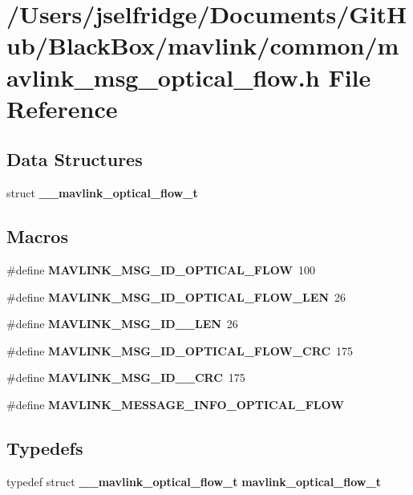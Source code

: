 \section{/\+Users/jselfridge/\+Documents/\+Git\+Hub/\+Black\+Box/mavlink/common/mavlink\+\_\+msg\+\_\+optical\+\_\+flow.h File Reference}
\label{mavlink__msg__optical__flow_8h}
\subsection*{Data Structures}
\begin{DoxyCompactItemize}
\item 
struct \textbf{ \+\_\+\+\_\+mavlink\+\_\+optical\+\_\+flow\+\_\+t}
\end{DoxyCompactItemize}
\subsection*{Macros}
\begin{DoxyCompactItemize}
\item 
\#define \textbf{ M\+A\+V\+L\+I\+N\+K\+\_\+\+M\+S\+G\+\_\+\+I\+D\+\_\+\+O\+P\+T\+I\+C\+A\+L\+\_\+\+F\+L\+OW}~100
\item 
\#define \textbf{ M\+A\+V\+L\+I\+N\+K\+\_\+\+M\+S\+G\+\_\+\+I\+D\+\_\+\+O\+P\+T\+I\+C\+A\+L\+\_\+\+F\+L\+O\+W\+\_\+\+L\+EN}~26
\item 
\#define \textbf{ M\+A\+V\+L\+I\+N\+K\+\_\+\+M\+S\+G\+\_\+\+I\+D\+\_\+\_\+\+L\+EN}~26
\item 
\#define \textbf{ M\+A\+V\+L\+I\+N\+K\+\_\+\+M\+S\+G\+\_\+\+I\+D\+\_\+\+O\+P\+T\+I\+C\+A\+L\+\_\+\+F\+L\+O\+W\+\_\+\+C\+RC}~175
\item 
\#define \textbf{ M\+A\+V\+L\+I\+N\+K\+\_\+\+M\+S\+G\+\_\+\+I\+D\+\_\+\_\+\+C\+RC}~175
\item 
\#define \textbf{ M\+A\+V\+L\+I\+N\+K\+\_\+\+M\+E\+S\+S\+A\+G\+E\+\_\+\+I\+N\+F\+O\+\_\+\+O\+P\+T\+I\+C\+A\+L\+\_\+\+F\+L\+OW}
\end{DoxyCompactItemize}
\subsection*{Typedefs}
\begin{DoxyCompactItemize}
\item 
typedef struct \textbf{ \+\_\+\+\_\+mavlink\+\_\+optical\+\_\+flow\+\_\+t} \textbf{ mavlink\+\_\+optical\+\_\+flow\+\_\+t}
\end{DoxyCompactItemize}



